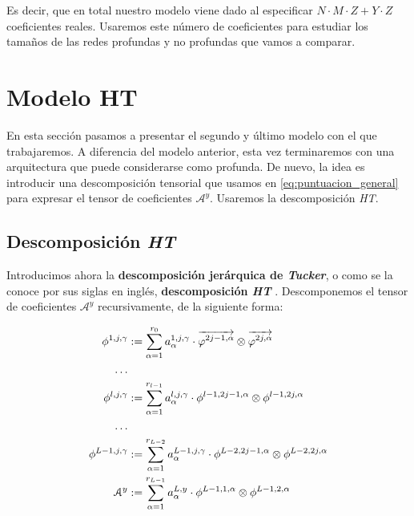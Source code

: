 Es decir, que en total nuestro modelo viene dado al especificar $N \cdot M \cdot Z + Y \cdot Z$ coeficientes reales. Usaremos este número de coeficientes para estudiar los tamaños de las redes profundas y no profundas que vamos a comparar.

\section{Modelo HT} \label{sec:modelo_ht}

En esta sección pasamos a presentar el segundo y último modelo con el que trabajaremos. A diferencia del modelo anterior, esta vez terminaremos con una arquitectura que puede considerarse como profunda. De nuevo, la idea es introducir una descomposición tensorial que usamos en \eqref{eq:puntuacion_general} para expresar el tensor de coeficientes $\mathcal{A}^y$. Usaremos la descomposición \textit{HT}.

\subsection{Descomposición \textit{HT}} \label{subs:descomposicion_ht}

Introducimos ahora la \textbf{descomposición jerárquica de \textit{Tucker}}, o como se la conoce por sus siglas en inglés, \textbf{descomposición \textit{HT}} \cite{matematicas:descomposicion_ht} \cite{matematicas:principal}. Descomponemos el tensor de coeficientes $\mathcal{A}^y$ recursivamente, de la siguiente forma:

\begin{equation} \label{eq:descomposicion_ht}
	\begin{split}
		\phi^{1, j, \gamma} &:= \sum_{\alpha = 1}^{r_0} a_{\alpha}^{1, j, \gamma} \cdot \overrightarrow{\varphi^{2j-1, \alpha}} \otimes \overrightarrow{\varphi^{2j, \alpha}} \\
		\ldots \\
		\phi^{l, j, \gamma} &:= \sum_{\alpha = 1}^{r_{l-1}} a_{\alpha}^{l, j, \gamma} \cdot \phi^{l-1, 2j-1, \alpha} \otimes \phi^{l-1, 2j, \alpha} \\
		\ldots \\
		\phi^{L - 1, j, \gamma} &:= \sum_{\alpha = 1}^{r_{L-2}} a_{\alpha}^{L - 1, j, \gamma} \cdot \phi^{L-2, 2j-1, \alpha} \otimes \phi^{L-2, 2j, \alpha} \\
		\mathcal{A}^y &:= \sum_{\alpha = 1}^{r_{L-1}} a_{\alpha}^{L, y} \cdot \phi^{L-1, 1, \alpha} \otimes \phi^{L-1, 2, \alpha}
	\end{split}
\end{equation}

